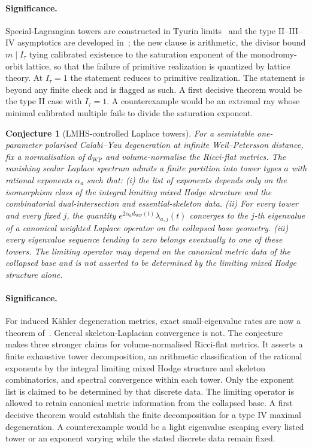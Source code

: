 \documentclass[11pt]{article}
\newtheorem{conjecture}{Conjecture}
\theoremstyle{definition}
\begin{document}
\paragraph{Significance.}
Special-Lagrangian towers are constructed in Tyurin limits~\cite{HMWW26} and the type II--III--IV asymptotics are developed in~\cite{MWW26}; the new clause is arithmetic, the divisor bound $m\mid I_\tau$ tying calibrated existence to the saturation exponent of the monodromy-orbit lattice, so that the failure of primitive realization is quantized by lattice theory.  At $I_\tau=1$ the statement reduces to primitive realization.  The statement is beyond any finite check and is flagged as such.  A first decisive theorem would be the type II case with $I_\tau=1$.  A counterexample would be an extremal ray whose minimal calibrated multiple fails to divide the saturation exponent.

\begin{conjecture}[LMHS-controlled Laplace towers]\label{ad19}
For a semistable one-parameter polarised Calabi--Yau degeneration at infinite Weil--Petersson distance, fix a normalisation of $d_{\mathrm{WP}}$ and volume-normalise the Ricci-flat metrics.  The vanishing scalar Laplace spectrum admits a finite partition into tower types $a$ with rational exponents $\alpha_a$ such that:
(i) the list of exponents depends only on the isomorphism class of the integral limiting mixed Hodge structure and the combinatorial dual-intersection and essential-skeleton data.
(ii) For every tower and every fixed $j$, the quantity $e^{2\alpha_ad_{\mathrm{WP}}(t)}\lambda_{a,j}(t)$ converges to the $j$-th eigenvalue of a canonical weighted Laplace operator on the collapsed base geometry.
(iii) every eigenvalue sequence tending to zero belongs eventually to one of these towers.
The limiting operator may depend on the canonical metric data of the collapsed base and is not asserted to be determined by the limiting mixed Hodge structure alone.
\end{conjecture}

\paragraph{Significance.}
For induced K\"ahler degeneration metrics, exact small-eigenvalue rates are now a theorem of~\cite{Cao26}.  General skeleton-Laplacian convergence is not.  The conjecture makes three stronger claims for volume-normalised Ricci-flat metrics.  It asserts a finite exhaustive tower decomposition, an arithmetic classification of the rational exponents by the integral limiting mixed Hodge structure and skeleton combinatorics, and spectral convergence within each tower.  Only the exponent list is claimed to be determined by that discrete data.  The limiting operator is allowed to retain canonical metric information from the collapsed base.  A first decisive theorem would establish the finite decomposition for a type IV maximal degeneration.  A counterexample would be a light eigenvalue escaping every listed tower or an exponent varying while the stated discrete data remain fixed.
\end{document}
